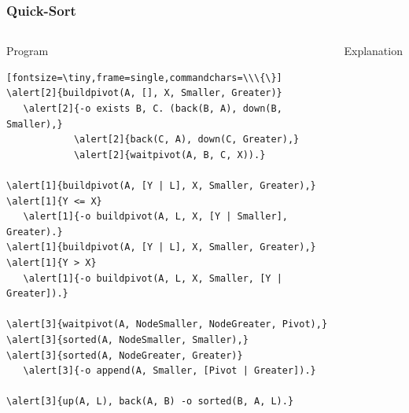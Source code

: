\documentclass{beamer}
\let\oldalert\alert
\renewcommand{\alert}[2][]{%
  \if\relax\detokenize{#1}\relax%
    \oldalert{#2}%
  \else
    \oldalert<#1>{#2}%
  \fi}
\begin{document}
\begin{frame}[fragile]
  \frametitle{Quick-Sort}
  \begin{columns}[t]
       \begin{block}{Program}
         \begin{verbatim}[fontsize=\tiny,frame=single,commandchars=\\\{\}]
\alert[2]{buildpivot(A, [], X, Smaller, Greater)}
   \alert[2]{-o exists B, C. (back(B, A), down(B, Smaller),}
            \alert[2]{back(C, A), down(C, Greater),}
            \alert[2]{waitpivot(A, B, C, X)).}

\alert[1]{buildpivot(A, [Y | L], X, Smaller, Greater),}
\alert[1]{Y <= X}
   \alert[1]{-o buildpivot(A, L, X, [Y | Smaller], Greater).}
\alert[1]{buildpivot(A, [Y | L], X, Smaller, Greater),}
\alert[1]{Y > X}
   \alert[1]{-o buildpivot(A, L, X, Smaller, [Y | Greater]).}

\alert[3]{waitpivot(A, NodeSmaller, NodeGreater, Pivot),}
\alert[3]{sorted(A, NodeSmaller, Smaller),}
\alert[3]{sorted(A, NodeGreater, Greater)}
   \alert[3]{-o append(A, Smaller, [Pivot | Greater]).}
   
\alert[3]{up(A, L), back(A, B) -o sorted(B, A, L).}
         \end{verbatim}
      \end{block}
      \begin{block}{Explanation}
         {\scriptsize
         \begin{itemize}
         \end{itemize}
         }
      \end{block}
   \end{columns}
\end{frame}
\end{document}
